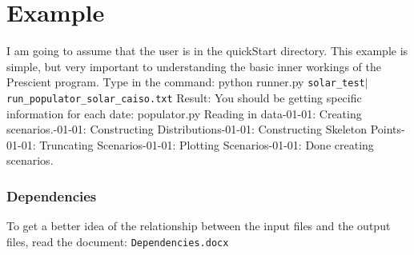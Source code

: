 \documentclass[12pt]{article}
\begin{document}
\section{Example}
I am going to assume that the user is in the quickStart directory.\newline
This example is simple, but very important to understanding the basic inner workings of the Prescient program.\newline
Type in the command:
\newline
python runner.py \verb|solar_test|$|$ \verb|run_populator_solar_caiso.txt|\newline
Result:\newline
You should be getting specific information for each date:\newline
populator.py\newline
Reading in data-01-01: Creating scenarios.-01-01: Constructing Distributions-01-01: Constructing Skeleton Points-01-01: Truncating Scenarios-01-01: Plotting Scenarios-01-01: Done creating scenarios.\newline
\subsubsection{Dependencies}
To get a better idea of the relationship between the input files and the output files, read the document:\newline
 \verb|Dependencies.docx|
\end{document}

